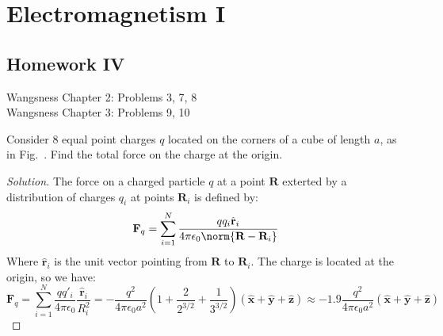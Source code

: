 \documentclass[crop=false,class=article,oneside]{standalone}
\begin{document}
    \ifx\ifphysicscourseselectromagnetismI\undefined
        \section*{Electromagnetism I}
        \setcounter{section}{4}
        \renewcommand\thefigure{%
            \arabic{section}.\arabic{figure}%
        }
        \renewcommand\thesubfigure{%
            \arabic{section}.\arabic{figure}.\arabic{subfigure}%
        }
    \fi    
    \subsection{Homework IV}
    Wangsness Chapter 2: Problems 3, 7, 8\\
    Wangsness Chapter 3: Problems 9, 10
    \begin{problem}[Wangsness 2-3]
        \label{problem:EMAG_wangsness_2_3}
        Consider $8$ equal point charges $q$ located on
        the corners of a cube of length $a$, as in
        Fig.~.
        Find the total force on the charge at the origin.
    \end{problem}
    \begin{proof}[Solution]
        The force on a charged particle $q$ at a point $\mathbf{R}$
        exterted by a distribution of charges $q_{i}$ at points
        $\mathbf{R}_{i}$ is defined by:
        \begin{equation*}
            \mathbf{F}_{q}
            =\sum_{i=1}^{N}
            \frac{qq_{i}\hat{\mathbf{r}}_{i}}
                 {4\pi\epsilon_{0}\norm{\mathbf{R}-\mathbf{R}_{i}}}
        \end{equation*}
        Where $\hat{\mathbf{r}}_{i}$ is the unit vector
        pointing from $\mathbf{R}$ to $\mathbf{R}_{i}$.
        The charge is located at the origin, so we have:
        \begin{equation*}
            \mathbf{F}_q=
            \sum_{i=1}^{N}\frac{qq'_{i}}{4\pi\epsilon_0}
            \frac{\hat{\mathbf{r}}_{i}}{R_{i}^{2}}
            =-\frac{q^{2}}{4\pi \epsilon_0 a^{2}}
            (1+\frac{2}{2^{3/2}}+\frac{1}{3^{3/2}})
            (\hat{\mathbf{x}}+\hat{\mathbf{y}}
            +\hat{\mathbf{z}})
            \approx-1.9\frac{q^{2}}{4\pi\epsilon_{0}a^{2}}
            (\hat{\mathbf{x}}
            +\hat{\mathbf{y}}
            +\hat{\mathbf{z}})
        \end{equation*}
    \end{proof}
\end{document}
